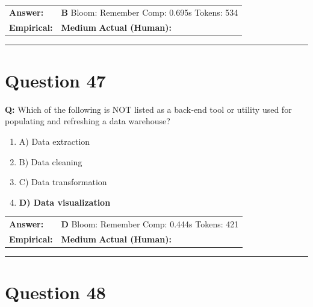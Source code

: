 \documentclass[9pt]{article}
\begin{document}
\begin{tabular}{@{}l p{10.5cm}@{}}
\textbf{Answer:} & \textbf{B} \hspace{1em} Bloom: Remember \hspace{1em} Comp: 0.695s \hspace{1em} Tokens: 534 \\
\textbf{Empirical:} & \textbf{Medium} \hspace{1em} \textbf{Actual (Human):} \underline{\hspace{5cm}}
\end{tabular}

\vspace{0.2cm}
\rule{\textwidth}{0.4pt}
\vspace{0.2cm}


\section*{Question 47}

\textbf{Q:} Which of the following is NOT listed as a back‑end tool or utility used for populating and refreshing a data warehouse?

\begin{enumerate}[label=\textbf{\alph{*})}, nosep]
    \item A) Data extraction
    \item B) Data cleaning
    \item C) Data transformation
    \item \textbf{D) Data visualization} %

\end{enumerate}

\begin{tabular}{@{}l p{10.5cm}@{}}
\textbf{Answer:} & \textbf{D} \hspace{1em} Bloom: Remember \hspace{1em} Comp: 0.444s \hspace{1em} Tokens: 421 \\
\textbf{Empirical:} & \textbf{Medium} \hspace{1em} \textbf{Actual (Human):} \underline{\hspace{5cm}}
\end{tabular}

\vspace{0.2cm}
\rule{\textwidth}{0.4pt}
\vspace{0.2cm}


\section*{Question 48}
\end{document}
